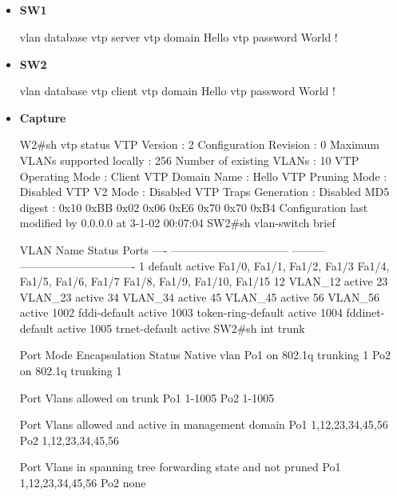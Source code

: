 \documentclass[10pt]{article}
\begin{document}
\subsection{}
\begin{itemize}
\item {\bf SW1}
\begin{verbatim*}
vlan database
 vtp server
 vtp domain Hello
 vtp password World
!
\end{verbatim*}
\item {\bf SW2}
\begin{verbatim*}
vlan database
 vtp client
 vtp domain Hello
 vtp password World
!
\end{verbatim*}
\item {\bf Capture}
\begin{verbatim*}
W2#sh vtp status
VTP Version                     : 2
Configuration Revision          : 0
Maximum VLANs supported locally : 256
Number of existing VLANs        : 10
VTP Operating Mode              : Client
VTP Domain Name                 : Hello
VTP Pruning Mode                : Disabled
VTP V2 Mode                     : Disabled
VTP Traps Generation            : Disabled
MD5 digest                      : 0x10 0xBB 0x02 0x06 0xE6 0x70 0x70 0xB4
Configuration last modified by 0.0.0.0 at 3-1-02 00:07:04
SW2#sh vlan-switch brief

VLAN Name                             Status    Ports
---- -------------------------------- --------- -------------------------------
1    default                          active    Fa1/0, Fa1/1, Fa1/2, Fa1/3
                                                Fa1/4, Fa1/5, Fa1/6, Fa1/7
                                                Fa1/8, Fa1/9, Fa1/10, Fa1/15
12   VLAN_12                          active
23   VLAN_23                          active
34   VLAN_34                          active
45   VLAN_45                          active
56   VLAN_56                          active
1002 fddi-default                     active
1003 token-ring-default               active
1004 fddinet-default                  active
1005 trnet-default                    active
SW2#sh int trunk

Port      Mode         Encapsulation  Status        Native vlan
Po1       on           802.1q         trunking      1
Po2       on           802.1q         trunking      1

Port      Vlans allowed on trunk
Po1       1-1005
Po2       1-1005

Port      Vlans allowed and active in management domain
Po1       1,12,23,34,45,56
Po2       1,12,23,34,45,56

Port      Vlans in spanning tree forwarding state and not pruned
Po1       1,12,23,34,45,56
Po2       none
\end{verbatim*}
\end{itemize}
\end{document}
